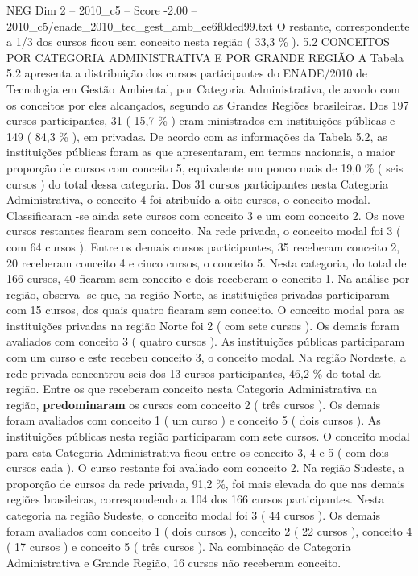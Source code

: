 \begin{textsample}{NEG Dim 2 – 2010\_c5 – Score -2.00 – 2010\_c5/enade\_2010\_tec\_gest\_amb\_ee6f0ded99.txt}
O restante, correspondente a 1/3 dos cursos ficou sem conceito nesta região ( 33,3 \% ). 5.2 CONCEITOS POR CATEGORIA ADMINISTRATIVA E POR GRANDE REGIÃO A Tabela 5.2 apresenta a distribuição dos cursos participantes do ENADE/2010 de Tecnologia em Gestão Ambiental, por Categoria Administrativa, de acordo com os conceitos por eles alcançados, segundo as Grandes Regiões brasileiras.
Dos 197 cursos participantes, 31 ( 15,7 \% ) eram ministrados em instituições públicas e 149 ( 84,3 \% ), em privadas.
De acordo com as informações da Tabela 5.2, as instituições públicas foram as que apresentaram, em termos nacionais, a maior proporção de cursos com conceito 5, equivalente um pouco mais de 19,0 \% ( seis cursos ) do total dessa categoria.
Dos 31 cursos participantes nesta Categoria Administrativa, o conceito 4 foi atribuído a oito cursos, o conceito modal.
Classificaram -se ainda sete cursos com conceito 3 e um com conceito 2.
Os nove cursos restantes ficaram sem conceito.
Na rede privada, o conceito modal foi 3 ( com 64 cursos ).
Entre os demais cursos participantes, 35 receberam conceito 2, 20 receberam conceito 4 e cinco cursos, o conceito 5.
Nesta categoria, do total de 166 cursos, 40 ficaram sem conceito e dois receberam o conceito 1.
Na análise por região, observa -se que, na região Norte, as instituições privadas participaram com 15 cursos, dos quais quatro ficaram sem conceito.
O conceito modal para as instituições privadas na região Norte foi 2 ( com sete cursos ).
Os demais foram avaliados com conceito 3 ( quatro cursos ).
As instituições públicas participaram com um curso e este recebeu conceito 3, o conceito modal.
Na região Nordeste, a rede privada concentrou seis dos 13 cursos participantes, 46,2 \% do total da região.
Entre os que receberam conceito nesta Categoria Administrativa na região, \textbf{predominaram} os cursos com conceito 2 ( três cursos ).
Os demais foram avaliados com conceito 1 ( um curso ) e conceito 5 ( dois cursos ).
As instituições públicas nesta região participaram com sete cursos.
O conceito modal para esta Categoria Administrativa ficou entre os conceito 3, 4 e 5 ( com dois cursos cada ).
O curso restante foi avaliado com conceito 2.
Na região Sudeste, a proporção de cursos da rede privada, 91,2 \%, foi mais elevada do que nas demais regiões brasileiras, correspondendo a 104 dos 166 cursos participantes.
Nesta categoria na região Sudeste, o conceito modal foi 3 ( 44 cursos ).
Os demais foram avaliados com conceito 1 ( dois cursos ), conceito 2 ( 22 cursos ), conceito 4 ( 17 cursos ) e conceito 5 ( três cursos ).
Na combinação de Categoria Administrativa e Grande Região, 16 cursos não receberam conceito.

\end{textsample}
